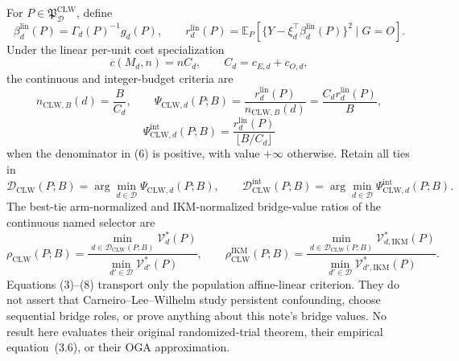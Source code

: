 For \(P\in\mathfrak P_{\mathcal D}^{\mathrm{CLW}}\), define
\[
 \beta_d^{\mathrm{lin}}(P)=\Gamma_d(P)^{-1}g_d(P),
 \qquad
 r_d^{\mathrm{lin}}(P)
 =\mathbb E_P\!\left[
 \{Y-\xi_d^\top\beta_d^{\mathrm{lin}}(P)\}^2\mid G=O
 \right].                                                  \tag{3}
\]
Under the linear per-unit cost specialization
\[
 c(M_d,n)=nC_d,
 \qquad C_d=c_{E,d}+c_{O,d},                               \tag{4}
\]
the continuous and integer-budget criteria are
\[
 n_{\mathrm{CLW},B}(d)=\frac{B}{C_d},
 \qquad
 \Psi_{\mathrm{CLW},d}(P;B)
 =\frac{r_d^{\mathrm{lin}}(P)}{n_{\mathrm{CLW},B}(d)}
 =\frac{C_dr_d^{\mathrm{lin}}(P)}{B},                      \tag{5}
\]
\[
 \Psi_{\mathrm{CLW},d}^{\mathrm{int}}(P;B)
 =\frac{r_d^{\mathrm{lin}}(P)}{\lfloor B/C_d\rfloor}      \tag{6}
\]
when the denominator in (6) is positive, with value \(+\infty\) otherwise.  Retain all ties in
\[
 \mathcal D_{\mathrm{CLW}}(P;B)
 =\arg\min_{d\in\mathcal D}\Psi_{\mathrm{CLW},d}(P;B),
 \qquad
 \mathcal D_{\mathrm{CLW}}^{\mathrm{int}}(P;B)
 =\arg\min_{d\in\mathcal D}\Psi_{\mathrm{CLW},d}^{\mathrm{int}}(P;B). \tag{7}
\]
The best-tie arm-normalized and IKM-normalized bridge-value ratios of the continuous named selector are
\[
 \rho_{\mathrm{CLW}}(P;B)
 =\frac{\min_{d\in\mathcal D_{\mathrm{CLW}}(P;B)}
 \mathcal V_d^*(P)}
 {\min_{d'\in\mathcal D}\mathcal V_{d'}^*(P)},
 \qquad
 \rho_{\mathrm{CLW}}^{\mathrm{IKM}}(P;B)
 =\frac{\min_{d\in\mathcal D_{\mathrm{CLW}}(P;B)}
 \mathcal V_{d,\mathrm{IKM}}^*(P)}
 {\min_{d'\in\mathcal D}\mathcal V_{d',\mathrm{IKM}}^*(P)}. \tag{8}
\]
Equations (3)--(8) transport only the population affine-linear criterion.  They do not assert that Carneiro--Lee--Wilhelm study persistent confounding, choose sequential bridge roles, or prove anything about this note's bridge values.  No result here evaluates their original randomized-trial theorem, their empirical equation~(3.6), or their OGA approximation.